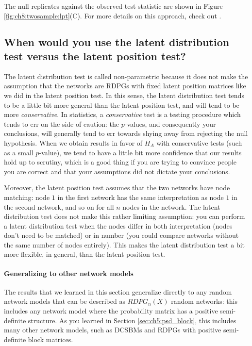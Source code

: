 The null replicates against the observed test statistic are shown in Figure \ref{fig:ch8:twosample:lpt}(C). For more details on this approach, check out \cite{Alyakin2020}.

\subsection{When would you use the latent distribution test versus the latent position test?}
\label{sec:ch8:twosample:lpt_vs_ldt}

The latent distribution test is called non-parametric because it does not make the assumption that the networks are RDPGs with fixed latent position matrices like we did in the latent position test. In this sense, the latent distribution test tends to be a little bit more general than the latent position test, and will tend to be more \textit{conservative}. In statistics, a \textit{conservative} test is a testing procedure which tends to err on the side of caution: the $p$-values, and consequently your conclusions, will generally tend to err towards shying away from rejecting the null hypothesis. When we obtain results in favor of $H_A$ with conservative tests (such as a small $p$-value), we tend to have a little bit more confidence that our results hold up to scrutiny, which is a good thing if you are trying to convince people you are correct and that your assumptions did not dictate your conclusions.

Moreover, the latent position test assumes that the two networks have node matching: node $1$ in the first network has the same interpretation as node $1$ in the second network, and so on for all $n$ nodes in the network. The latent distribution test does not make this rather limiting assumption: you can perform a latent distribution test when the nodes differ in both interpretation (nodes don't need to be matched) or in number (you could compare networks without the same number of nodes entirely). This makes the latent distribution test a bit more flexible, in general, than the latent position test.

\paragraph*{Generalizing to other network models}

The results that we learned in this section generalize directly to any random network models that can be described as $RDPG_n(X)$ random networks: this includes any network model where the probability matrix has a positive semi-definite structure. As you learned in Section \ref{sec:ch5:psd_block}, this includes many other network models, such as DCSBMs and RDPGs with positive semi-definite block matrices. 

